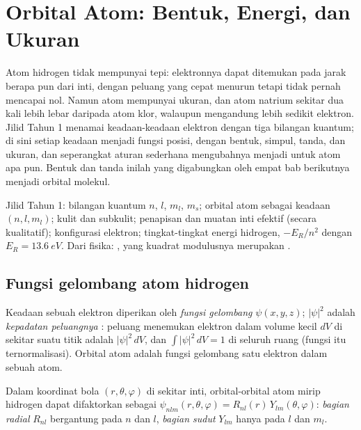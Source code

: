 \chapter{Orbital Atom: Bentuk, Energi, dan Ukuran}\label{ch:b2:atomic-orbitals}

Atom hidrogen tidak mempunyai tepi: elektronnya dapat ditemukan pada jarak
berapa pun dari inti, dengan peluang yang cepat menurun tetapi tidak
pernah mencapai nol. Namun atom mempunyai ukuran, dan atom natrium sekitar
dua kali lebih lebar daripada atom klor, walaupun mengandung lebih sedikit
elektron. Jilid Tahun 1 menamai keadaan-keadaan elektron dengan tiga
bilangan kuantum; di sini setiap keadaan menjadi fungsi posisi, dengan
bentuk, simpul, tanda, dan ukuran, dan seperangkat aturan sederhana
mengubahnya menjadi  untuk atom apa pun. Bentuk dan tanda
inilah yang digabungkan oleh empat bab berikutnya menjadi orbital molekul.

\begin{recall}
Jilid Tahun 1: bilangan kuantum $n$, $l$, $m_l$, $m_s$; orbital atom sebagai
keadaan $(n, l, m_l)$; kulit dan subkulit; penapisan dan muatan inti efektif
(secara kualitatif); konfigurasi elektron; tingkat-tingkat energi hidrogen,
$-E_R/n^2$ dengan $E_R = \qty{13.6}{eV}$. Dari fisika: ,
yang kuadrat modulusnya merupakan .
\end{recall}

\section{Fungsi gelombang atom hidrogen}

\begin{definition}\label{def:b2:atomic-orbitals:wavefunction}
Keadaan sebuah elektron diperikan oleh \emph{fungsi gelombang}
$\psi(x, y, z)$; $|\psi|^2$ adalah \emph{kepadatan peluangnya}
: peluang menemukan elektron dalam volume kecil
$dV$ di sekitar suatu titik adalah $|\psi|^2\,dV$, dan $\int|\psi|^2\,dV = 1$
di seluruh ruang (fungsi itu ternormalisasi). Orbital atom adalah fungsi
gelombang satu elektron dalam sebuah atom.
\end{definition}

\begin{definition}\label{def:b2:atomic-orbitals:radial-angular}
Dalam koordinat bola $(r, \theta, \varphi)$ di sekitar inti, orbital-orbital
atom mirip hidrogen dapat difaktorkan sebagai $\psi_{nlm}(r, \theta, \varphi) = R_{nl}(r)\,
Y_{lm}(\theta, \varphi)$: \emph{bagian radial} $R_{nl}$
bergantung pada $n$ dan $l$, \emph{bagian sudut}
$Y_{lm}$ hanya pada $l$ dan $m_l$.
\end{definition}

